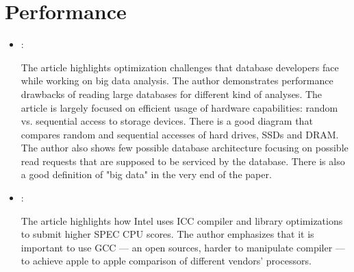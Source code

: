 \section*{Performance}
\begin{itemize}
    \item \cite{Jacobs:DataBasePerformance:2009}:

    The article highlights optimization challenges that database developers face while working on big data analysis. The author demonstrates performance drawbacks of reading large databases for different kind of analyses. The article is largely focused on efficient usage of hardware capabilities: random vs. sequential access to storage devices. There is a good diagram that compares random and sequential accesses of hard drives, SSDs and DRAM. The author also shows few possible database architecture focusing on possible read requests that are supposed to be serviced by the database. There is also a good definition of "big data" in the very end of the paper.

    \item \cite{Gwennap:IntelHidesBehindICC:2017}:

    The article highlights how Intel uses ICC compiler and library optimizations to submit higher SPEC CPU scores. The author emphasizes that it is important to use GCC --- an open sources, harder to manipulate compiler --- to achieve apple to apple comparison of different vendors' processors.
\end{itemize}


